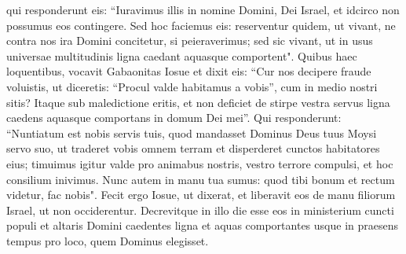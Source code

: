 \begin{biblechapter}
\verse qui responderunt eis: “Iuravimus illis in nomine Domini, Dei Israel, et idcirco non possumus eos contingere. 
\verse Sed hoc faciemus eis: reserventur quidem, ut vivant, ne contra nos ira Domini concitetur, si peieraverimus; 
\verse sed sic vivant, ut in usus universae multitudinis ligna caedant aquasque comportent". Quibus haec loquentibus, 
\verse vocavit Gabaonitas Iosue et dixit eis: “Cur nos decipere fraude voluistis, ut diceretis: “Procul valde habitamus a vobis”, cum in medio nostri sitis? 
\verse Itaque sub maledictione eritis, et non deficiet de stirpe vestra servus ligna caedens aquasque comportans in domum Dei mei”. 
\verse Qui responderunt: “Nuntiatum est nobis servis tuis, quod mandasset Dominus Deus tuus Moysi servo suo, ut traderet vobis omnem terram et disperderet cunctos habitatores eius; timuimus igitur valde pro animabus nostris, vestro terrore compulsi, et hoc consilium inivimus. 
\verse Nunc autem in manu tua sumus: quod tibi bonum et rectum videtur, fac nobis". 
\verse Fecit ergo Iosue, ut dixerat, et liberavit eos de manu filiorum Israel, ut non occiderentur. 
\verse Decrevitque in illo die esse eos in ministerium cuncti populi et altaris Domini caedentes ligna et aquas comportantes usque in praesens tempus pro loco, quem Dominus elegisset. 
\end{biblechapter}

